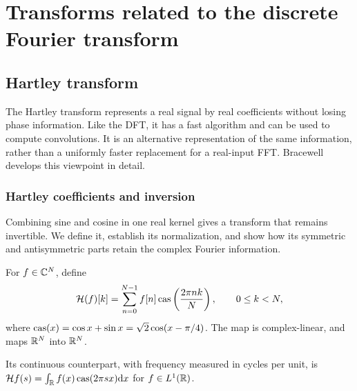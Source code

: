 \chapter{Transforms related to the discrete Fourier transform}
\label{chap-extension-trans-fourier}

\section{Hartley transform}
\label{sect1-trans-hartley}
The Hartley transform represents a real signal by real coefficients without
losing phase information. Like the DFT, it has a fast algorithm and can be
used to compute convolutions. It is an alternative representation of the
same information, rather than a uniformly faster replacement for a real-input
FFT. Bracewell~\cite{bracewell} develops this viewpoint in detail.

\subsection{Hartley coefficients and inversion}

Combining sine and cosine in one real kernel gives a transform that remains
invertible. We define it, establish its normalization, and show how its
symmetric and antisymmetric parts retain the complex Fourier information.

\begin{defn}
\label{notation-58}\label{notation-59}
For $f\in\mathbb{C}^N$, define
\begin{equation}
\label{eq-defn-transfo-hartley}
 \mathcal{H}(f)[k]=\sum_{n=0}^{N-1}f[n]\operatorname{cas}\left(\frac{2\pi nk}{N}\right),
 \qquad 0\leq k<N,
\end{equation}
where $\operatorname{cas}(x)=\cos x+\sin x=\sqrt2\cos(x-\pi/4)$.
The map is complex-linear, and maps $\mathbb{R}^N$ into $\mathbb{R}^N$.
\end{defn}
Its continuous counterpart, with frequency measured in cycles per unit,
is $\mathcal{H} f(s)=\int_{\mathbb{R}} f(x)\operatorname{cas}(2\pi sx)\mathrm{d} x$ for $f\in L^1(\mathbb{R})$.

